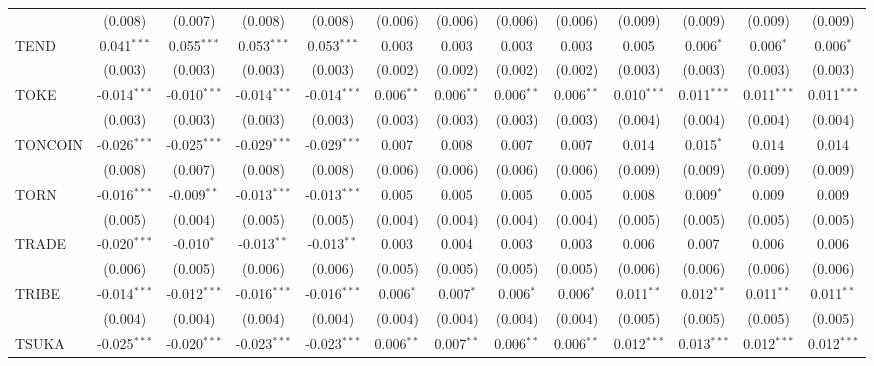 \begin{table}[!htbp]
\begin{tabular}{@{\extracolsep{5pt}}lcccccccccccc}
  & (0.008) & (0.007) & (0.008) & (0.008) & (0.006) & (0.006) & (0.006) & (0.006) & (0.009) & (0.009) & (0.009) & (0.009) \\
 TEND & 0.041$^{***}$ & 0.055$^{***}$ & 0.053$^{***}$ & 0.053$^{***}$ & 0.003$^{}$ & 0.003$^{}$ & 0.003$^{}$ & 0.003$^{}$ & 0.005$^{}$ & 0.006$^{*}$ & 0.006$^{*}$ & 0.006$^{*}$ \\
  & (0.003) & (0.003) & (0.003) & (0.003) & (0.002) & (0.002) & (0.002) & (0.002) & (0.003) & (0.003) & (0.003) & (0.003) \\
 TOKE & -0.014$^{***}$ & -0.010$^{***}$ & -0.014$^{***}$ & -0.014$^{***}$ & 0.006$^{**}$ & 0.006$^{**}$ & 0.006$^{**}$ & 0.006$^{**}$ & 0.010$^{***}$ & 0.011$^{***}$ & 0.011$^{***}$ & 0.011$^{***}$ \\
  & (0.003) & (0.003) & (0.003) & (0.003) & (0.003) & (0.003) & (0.003) & (0.003) & (0.004) & (0.004) & (0.004) & (0.004) \\
 TONCOIN & -0.026$^{***}$ & -0.025$^{***}$ & -0.029$^{***}$ & -0.029$^{***}$ & 0.007$^{}$ & 0.008$^{}$ & 0.007$^{}$ & 0.007$^{}$ & 0.014$^{}$ & 0.015$^{*}$ & 0.014$^{}$ & 0.014$^{}$ \\
  & (0.008) & (0.007) & (0.008) & (0.008) & (0.006) & (0.006) & (0.006) & (0.006) & (0.009) & (0.009) & (0.009) & (0.009) \\
 TORN & -0.016$^{***}$ & -0.009$^{**}$ & -0.013$^{***}$ & -0.013$^{***}$ & 0.005$^{}$ & 0.005$^{}$ & 0.005$^{}$ & 0.005$^{}$ & 0.008$^{}$ & 0.009$^{*}$ & 0.009$^{}$ & 0.009$^{}$ \\
  & (0.005) & (0.004) & (0.005) & (0.005) & (0.004) & (0.004) & (0.004) & (0.004) & (0.005) & (0.005) & (0.005) & (0.005) \\
 TRADE & -0.020$^{***}$ & -0.010$^{*}$ & -0.013$^{**}$ & -0.013$^{**}$ & 0.003$^{}$ & 0.004$^{}$ & 0.003$^{}$ & 0.003$^{}$ & 0.006$^{}$ & 0.007$^{}$ & 0.006$^{}$ & 0.006$^{}$ \\
  & (0.006) & (0.005) & (0.006) & (0.006) & (0.005) & (0.005) & (0.005) & (0.005) & (0.006) & (0.006) & (0.006) & (0.006) \\
 TRIBE & -0.014$^{***}$ & -0.012$^{***}$ & -0.016$^{***}$ & -0.016$^{***}$ & 0.006$^{*}$ & 0.007$^{*}$ & 0.006$^{*}$ & 0.006$^{*}$ & 0.011$^{**}$ & 0.012$^{**}$ & 0.011$^{**}$ & 0.011$^{**}$ \\
  & (0.004) & (0.004) & (0.004) & (0.004) & (0.004) & (0.004) & (0.004) & (0.004) & (0.005) & (0.005) & (0.005) & (0.005) \\
 TSUKA & -0.025$^{***}$ & -0.020$^{***}$ & -0.023$^{***}$ & -0.023$^{***}$ & 0.006$^{**}$ & 0.007$^{**}$ & 0.006$^{**}$ & 0.006$^{**}$ & 0.012$^{***}$ & 0.013$^{***}$ & 0.012$^{***}$ & 0.012$^{***}$ \\

\end{tabular}
\end{table}
